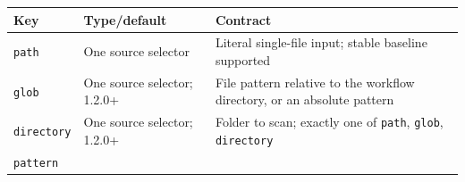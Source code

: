 \documentclass[
  10pt,
  a4paper,
  oneside]{scrreprt}
\begin{document}
\begin{longtable}[]{@{}lll@{}}
\toprule
\begin{minipage}[b]{0.30\columnwidth}\raggedright
Key\strut
\end{minipage} & \begin{minipage}[b]{0.30\columnwidth}\raggedright
Type/default\strut
\end{minipage} & \begin{minipage}[b]{0.30\columnwidth}\raggedright
Contract\strut
\end{minipage}\tabularnewline
\midrule
\endhead
\begin{minipage}[t]{0.30\columnwidth}\raggedright
\texttt{path}\strut
\end{minipage} & \begin{minipage}[t]{0.30\columnwidth}\raggedright
One source selector\strut
\end{minipage} & \begin{minipage}[t]{0.30\columnwidth}\raggedright
Literal single-file input; stable baseline supported\strut
\end{minipage}\tabularnewline
\begin{minipage}[t]{0.30\columnwidth}\raggedright
\texttt{glob}\strut
\end{minipage} & \begin{minipage}[t]{0.30\columnwidth}\raggedright
One source selector; 1.2.0+\strut
\end{minipage} & \begin{minipage}[t]{0.30\columnwidth}\raggedright
File pattern relative to the workflow directory, or an absolute
pattern\strut
\end{minipage}\tabularnewline
\begin{minipage}[t]{0.30\columnwidth}\raggedright
\texttt{directory}\strut
\end{minipage} & \begin{minipage}[t]{0.30\columnwidth}\raggedright
One source selector; 1.2.0+\strut
\end{minipage} & \begin{minipage}[t]{0.30\columnwidth}\raggedright
Folder to scan; exactly one of \texttt{path}, \texttt{glob},
\texttt{directory}\strut
\end{minipage}\tabularnewline
\begin{minipage}[t]{0.30\columnwidth}\raggedright
\texttt{pattern}\strut
\end{minipage} & \begin{minipage}[t]{0.30\columnwidth}\raggedright

\end{minipage}
\end{longtable}
\end{document}
